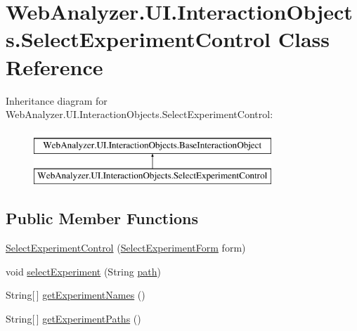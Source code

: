 \hypertarget{class_web_analyzer_1_1_u_i_1_1_interaction_objects_1_1_select_experiment_control}{}\section{Web\+Analyzer.\+U\+I.\+Interaction\+Objects.\+Select\+Experiment\+Control Class Reference}
\label{class_web_analyzer_1_1_u_i_1_1_interaction_objects_1_1_select_experiment_control}
Inheritance diagram for Web\+Analyzer.\+U\+I.\+Interaction\+Objects.\+Select\+Experiment\+Control\+:\begin{figure}[H]
\begin{center}
\leavevmode
\includegraphics[height=2.000000cm]{class_web_analyzer_1_1_u_i_1_1_interaction_objects_1_1_select_experiment_control}
\end{center}
\end{figure}
\subsection*{Public Member Functions}
\begin{DoxyCompactItemize}
\item 
\hyperlink{class_web_analyzer_1_1_u_i_1_1_interaction_objects_1_1_select_experiment_control_a0ec8c7149c5fc197768a0def5c1cf3ab}{Select\+Experiment\+Control} (\hyperlink{class_web_analyzer_1_1_u_i_1_1_select_experiment_form}{Select\+Experiment\+Form} form)
\item 
void \hyperlink{class_web_analyzer_1_1_u_i_1_1_interaction_objects_1_1_select_experiment_control_a1bf6dae0d6ce2c7c6dcf63dfe72e7d58}{select\+Experiment} (String \hyperlink{bin_2x64_2_release_2_u_i_2_h_t_m_l_resources_2js_2src_2create__experiment_8js_aa72e0c8a20e6bcc571d3a1c51846e627}{path})
\item 
String\mbox{[}$\,$\mbox{]} \hyperlink{class_web_analyzer_1_1_u_i_1_1_interaction_objects_1_1_select_experiment_control_aa7dda6b33c3fa7d8f154af6722ed61e9}{get\+Experiment\+Names} ()
\item 
String\mbox{[}$\,$\mbox{]} \hyperlink{class_web_analyzer_1_1_u_i_1_1_interaction_objects_1_1_select_experiment_control_a51d3afa57c307c296f8a2ed27a0f106c}{get\+Experiment\+Paths} ()
\end{DoxyCompactItemize}
